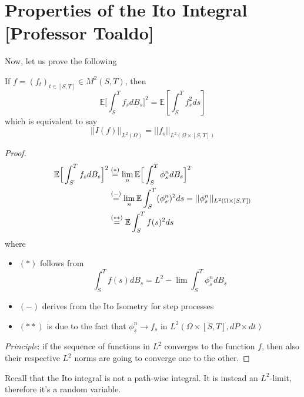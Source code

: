 \chapter{Properties of the Ito Integral [Professor Toaldo]}
Now, let us prove the following 
\begin{PropBox}
    \begin{Proposition}
    If $f=(f_t)_{t \in [S,T]} \in M^2(S,T)$, then
    \begin{equation*}
        \mathbb{E}\Big[\int_S^T f_s dB_s\Big]^2 = \mathbb{E}[\int_S^T f_s^2 ds]
    \end{equation*}
    which is equivalent to say
    \begin{equation}
        ||I(f)||_{L^2(\Omega)} = ||f_s||_{L^2(\Omega \times [S,T])}
    \end{equation}
\end{Proposition}
\end{PropBox}
\begin{ProofBox}
    \begin{proof}
    \begin{align*}
        \mathbb{E}\Big[\int_S^T f_s dB_s\Big]^2 &\stackrel{(*)}= \lim_n \mathbb{E}\Big[\int_S^T \phi_s^n dB_s\Big]^2 \\
        &\stackrel{(-)}= \lim_n \mathbb{E} \int_S^T (\phi_s^n)^2 ds = ||\phi_s^n||_{L^2(\Omega \times [S,T])}\\
        &\stackrel{(**)}= \mathbb{E} \int_S^T f(s)^2 ds
    \end{align*}
    where 
    \begin{itemize}
        \item $(*)$ follows from 
        \begin{equation*}
            \int_S^T f(s)dB_s = L^2 - \lim \int_S^T \phi_s^n dB_s
        \end{equation*}
        \item $(-)$ derives from the Ito Isometry for step processes
        \item $(**)$ is due to the fact that $\phi_s^n \rightarrow f_s$ in $L^2(\Omega \times [S,T], dP \times dt)$
    \end{itemize}
    \emph{Principle}: if the sequence of functions in $L^2$ converges to the function $f$, then also their respective $L^2$ norms are going to converge one to the other.
\end{proof}
\end{ProofBox}
\begin{remark}
    Recall that the Ito integral is not a path-wise integral. It is instead an $L^2$-limit, therefore it's a random variable. 
\end{remark}

